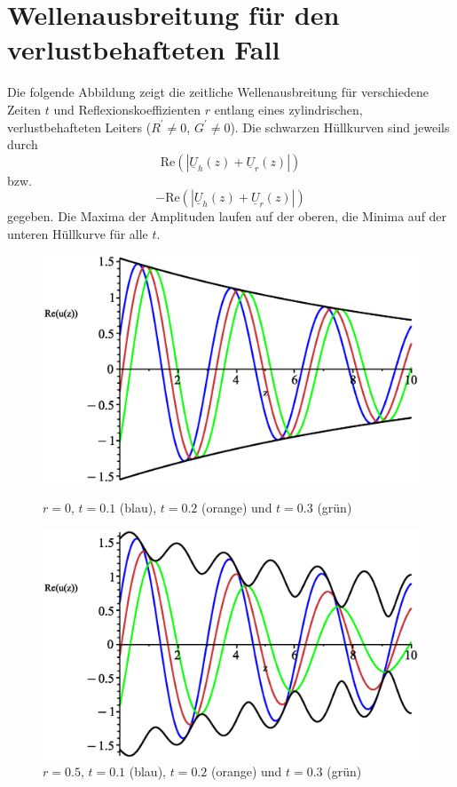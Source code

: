 \documentclass[paper=a4, parskip=half-, ngerman, fontsize=11pt]{scrreprt}
\begin{document}
\chapter{Wellenausbreitung für den verlustbehafteten Fall}
Die folgende Abbildung zeigt die zeitliche Wellenausbreitung für verschiedene Zeiten $t$ und Reflexionskoeffizienten
$r$ entlang eines zylindrischen, verlustbehafteten Leiters (\mbox{$R^{\prime} \neq 0$}, $G^{\prime} \neq 0$). Die
schwarzen
Hüllkurven sind jeweils durch \[
\mathrm{Re} ( \left| \underline{U}_{h}(z) + \underline{U}_{r}(z) \right| )
\] bzw. \[
- \mathrm{Re} ( \left| \underline{U}_{h}(z) + \underline{U}_{r}(z) \right| )
\] gegeben. Die Maxima der Amplituden laufen auf der oberen, die Minima auf der unteren Hüllkurve für alle $t$.
\begin{figure}[H]
    \begin{minipage}{0.45\textwidth}
        \centering
        \includegraphics[width=\linewidth]{../graphics/Enveloppe/verlustbehaftet/R0}
        \caption*{$r=0$, $t=0.1$ (blau), $t=0.2$ (orange) und $t=0.3$ (grün)}
    \end{minipage}\hfill
    \begin{minipage}{0.45\textwidth}
        \centering
        \includegraphics[width=\linewidth]{../graphics/Enveloppe/verlustbehaftet/R0.5}
        \caption*{$r=0.5$, $t=0.1$ (blau), $t=0.2$ (orange) und $t=0.3$ (grün)}
    \end{minipage}


\end{figure}
\end{document}
